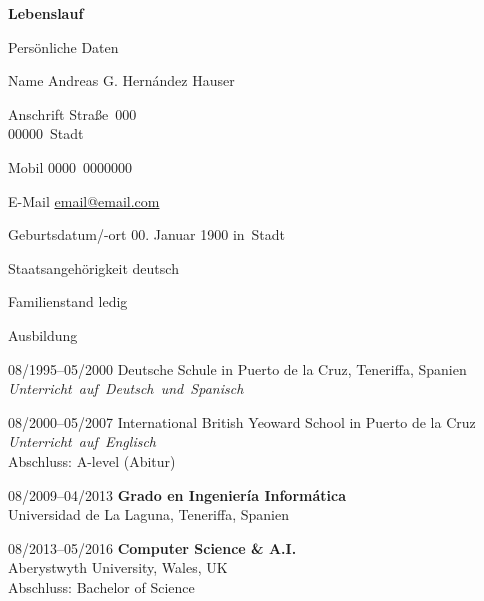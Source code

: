 \documentclass[11pt,a4paper,oneside,final]{scrartcl}
\begin{document}
\noindent\textbf{\Large{Lebenslauf}}

\vspace{1em}


\vspace{2em}

\begin{cv}

    \begin{cvlist}{Persönliche Daten}
        \setlength\itemsep{-0.5em}
        \item[Name] Andreas G. Hernández Hauser
        \item[Anschrift] Straße~000\\
            00000~Stadt
            \setlength\itemsep{0em}
        \item[Mobil] 0000~0000000
        \setlength\itemsep{-0.5em}
        \item[E-Mail] \href{mailto:email@email.com}{email@email.com}
        \setlength\itemsep{0em}
        \item[Geburtsdatum/-ort] 00. Januar 1900 in~Stadt
        \setlength\itemsep{-0.5em}
        \item[Staatsangehörigkeit] deutsch
        \item[Familienstand] ledig

        \sepspace
    \end{cvlist}

    \begin{cvlist}{Ausbildung}
        \item[08/1995--05/2000] Deutsche Schule in Puerto de la Cruz, Teneriffa, Spanien\\
            \textit{Unterricht~auf~Deutsch~und~Spanisch}
        \item[08/2000--05/2007] International British Yeoward School in Puerto de la Cruz\\
            \textit{Unterricht~auf~Englisch}\\
            Abschluss: A-level (Abitur)
        \item[08/2009--04/2013] \textbf{Grado en Ingeniería Informática}\\
            Universidad de La Laguna, Teneriffa, Spanien
        \item[08/2013--05/2016] \textbf{Computer Science \& A.I.}\\
            Aberystwyth University, Wales, UK\\
            Abschluss: Bachelor of Science


\end{cvlist}
\end{cv}
\end{document}
